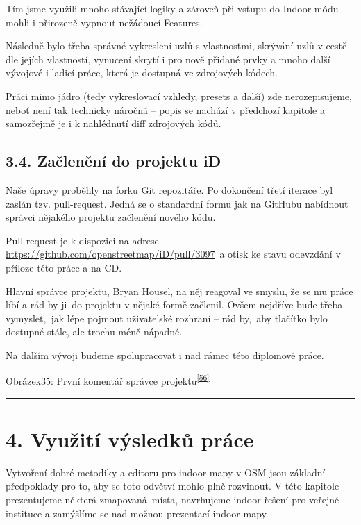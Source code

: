 Tím jsme využili mnoho stávající logiky a zároveň při vstupu do Indoor módu mohli i přirozeně vypnout nežádoucí Features.

Následně bylo třeba správné vykreslení uzlů s vlastnostmi, skrývání uzlů v cestě dle jejích vlastností, vynucení skrytí i pro nově přidané prvky a mnoho další vývojové i ladicí práce, která je dostupná ve zdrojových kódech.

Práci mimo jádro (tedy vykreslovací vzhledy, presets a další) zde nerozepisujeme, neboť není tak technicky náročná -- popis se nachází v předchozí kapitole a samozřejmě je i k nahlédnutí diff zdrojových kódů.

\section{3.4. Začlenění do projektu iD}\label{zaux10dlenux11bnuxed-do-projektu-id}

Naše úpravy proběhly na forku Git repozitáře. Po dokončení třetí iterace byl zaslán tzv. pull-request. Jedná se o standardní formu jak na GitHubu nabídnout správci nějakého projektu začlenění nového kódu.

Pull request je k dispozici na adrese \href{}{https://github.com/openstreetmap/iD/pull/3097}~a otisk ke stavu odevzdání v příloze této práce a na CD.

Hlavní správce projektu, Bryan Housel, na něj reagoval ve smyslu, že se mu práce líbí a rád by ji~do projektu v nějaké formě začlenil. Ovšem nejdříve bude třeba vymyslet,~jak lépe pojmout uživatelské rozhraní -- rád by,~aby tlačítko bylo dostupné stále, ale trochu méně nápadné.

Na dalším vývoji budeme spolupracovat i nad rámec této diplomové práce.

Obrázek35: První komentář správce projektu\textsuperscript{\href{}{{[}56{]}}}

\begin{center}\rule{0.5\linewidth}{\linethickness}\end{center}

\chapter{4. Využití výsledků práce}\label{vyuux17eituxed-vuxfdsledkux16f-pruxe1ce}

Vytvoření dobré metodiky a editoru pro indoor mapy v OSM jsou základní předpoklady pro to, aby se toto odvětví mohlo plně rozvinout. V této kapitole prezentujeme některá zmapovaná~místa, navrhujeme indoor řešení pro veřejné instituce a zamýšlíme se nad možnou prezentací indoor mapy.

